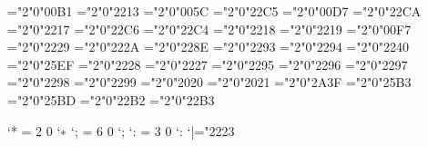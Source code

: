 \Umathchardef\pm="2"0"00B1        %
\Umathchardef\mp="2"0"2213        %
\Umathchardef\setminus="2"0"005C  %
\Umathchardef\cdot="2"0"22C5      %
\Umathchardef\times="2"0"00D7     %
\Umathchardef\rtimes="2"0"22CA    %
\Umathchardef\ast="2"0"2217       %
\Umathchardef\star="2"0"22C6      %
\Umathchardef\diamond="2"0"22C4   %
\Umathchardef\circ="2"0"2218      %
\Umathchardef\bullet="2"0"2219    %
\Umathchardef\div="2"0"00F7       %
\Umathchardef\cap="2"0"2229       %
\Umathchardef\cup="2"0"222A       %
\Umathchardef\uplus="2"0"228E     %
\Umathchardef\sqcap="2"0"2293     %
\Umathchardef\sqcup="2"0"2294     %
\Umathchardef\wr="2"0"2240        %
\Umathchardef\bigcirc="2"0"25EF   %
\Umathchardef\vee="2"0"2228       %
\let\lor=\vee
\Umathchardef\wedge="2"0"2227     %
\let\land=\wedge
\Umathchardef\oplus="2"0"2295     %
\Umathchardef\ominus="2"0"2296    %
\Umathchardef\otimes="2"0"2297    %
\Umathchardef\oslash="2"0"2298    %
\Umathchardef\odot="2"0"2299      %
\Umathchardef\dagger="2"0"2020    %
\Umathchardef\ddagger="2"0"2021   %
\Umathchardef\amalg="2"0"2A3F     %
\Umathchardef\bigtriangleup="2"0"25B3   %
\Umathchardef\bigtriangledown="2"0"25BD %
\Umathchardef\triangleleft="2"0"22B2    %
\Umathchardef\triangleright="2"0"22B3   %

\Umathcode`* = 2 0 `∗            %
\Umathcode`; = 6 0 `;            %
\Umathcode`: = 3 0 `:            %
\Umathcodenum`|="2223             %

